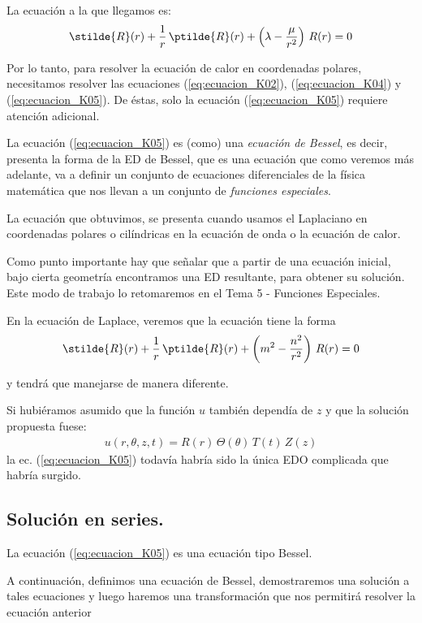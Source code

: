 La ecuación a la que llegamos es:
\begin{align}
\stilde{R} (r) + \dfrac{1}{r} \, \ptilde{R} (r) + \left( \lambda - \dfrac{\mu}{r^{2}} \right) \, R(r) = 0
\label{eq:ecuacion_K05}    
\end{align}

Por lo tanto, para resolver la ecuación de calor en coordenadas polares, necesitamos resolver las ecuaciones (\ref{eq:ecuacion_K02}), (\ref{eq:ecuacion_K04}) y (\ref{eq:ecuacion_K05}). De éstas, solo la ecuación (\ref{eq:ecuacion_K05}) requiere atención adicional.

La ecuación (\ref{eq:ecuacion_K05}) es (como) una \emph{ecuación de Bessel}, es decir, presenta la forma de la ED de Bessel, que es una ecuación que como veremos más adelante, va a definir un conjunto de ecuaciones diferenciales de la física matemática que nos llevan a un conjunto de \emph{funciones especiales}.

La ecuación que obtuvimos, se presenta cuando usamos el Laplaciano en coordenadas polares o cilíndricas en la ecuación de onda o la ecuación de calor.

Como punto importante hay que señalar que a partir de una ecuación inicial, bajo cierta geometría encontramos una ED resultante, para obtener su solución. Este modo de trabajo lo retomaremos en el Tema 5 - Funciones Especiales.

En la ecuación de Laplace, veremos que la ecuación tiene la forma
\begin{align*}
\stilde{R} (r) + \dfrac{1}{r} \, \ptilde{R} (r) + \left( m^{2} - \dfrac{n^{2}}{r^{2}} \right) \, R(r) = 0
\end{align*}

y tendrá que manejarse de manera diferente.

Si hubiéramos asumido que la función $u$ también dependía de $z$ y que la solución propuesta fuese:
\begin{align*}
u(r, \theta, z, t) =  R(r) \, \Theta (\theta) \, T(t) \, Z(z)
\end{align*}
la ec. (\ref{eq:ecuacion_K05}) todavía habría sido la única EDO complicada que habría surgido.

\subsection{Solución en series.}

La ecuación (\ref{eq:ecuacion_K05}) es una ecuación tipo Bessel.

A continuación, definimos una ecuación de Bessel, demostraremos una solución a tales ecuaciones y luego haremos una transformación que nos permitirá resolver la ecuación anterior

